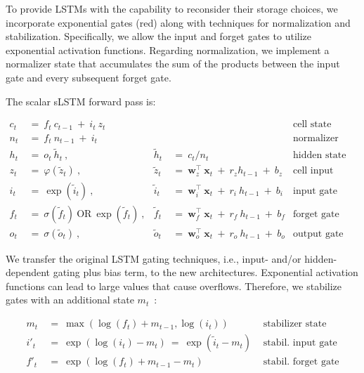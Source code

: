 To provide LSTMs with the capability to reconsider their storage choices, we incorporate exponential gates (red) along with techniques for normalization and stabilization. Specifically, we allow the input and forget gates to utilize exponential activation functions. Regarding normalization, we implement a normalizer state that accumulates the sum of the products between the input gate and every subsequent forget gate.

The scalar sLSTM forward pass is:

\begin{align}
\label{eq:slstmforward}
c_t \ &= \  f_t \ c_{t-1} \ + \ i_t \ z_t & & 
 &\text{cell state} \\
n_t \ &= \  f_t \ n_{t-1} \ + \ i_t  & & 
 &\text{normalizer state} \\
h_t \ &= \ o_t \ \tilde{h}_t \ ,
  &\tilde{h}_t \ &= \ c_t / n_t
&\text{hidden state} \\
z_t \ &= \ \varphi \left( \tilde{z}_t \right) \ , 
  &\tilde{z}_t \ &=  \ \mathbf{w}^\top_{z} \ \mathbf{x}_t \ + \
  r_{z}  h_{t-1} \ + \  b_{z}
  &\text{cell input} \\
i_t \ &= \ \!\exp \left( \tilde{i}_t  \right) \ , 
  &\tilde{i}_t \ &= \ \mathbf{w}^\top_{i} \ \mathbf{x}_t \ + \
  r_{i}  \ h_{t-1} \ + \  b_{i}
  &\text{input gate} \\
f_t \ &= \ \sigma \left(  \tilde{f}_t \right) \ \text{OR} \
\!\exp \left(  \tilde{f}_t \right) \ ,
  &\tilde{f}_t \ &= \ \mathbf{w}^\top_{f} \ \mathbf{x}_t  \ + \
  r_{f}  \ h_{t-1} \ + \  b_{f}
  &\text{forget gate} \\
o_t \ &= \ \sigma \left( \tilde{o}_t \right) \ , 
  &\tilde{o}_t  \ &= \ \mathbf{w}^\top_{o} \ \mathbf{x}_t \ + \
  r_{o}  \ h_{t-1} \ + \  b_{o}
  &\text{output gate} 
\end{align}

We transfer the original LSTM gating techniques, i.e., input- and/or hidden-dependent gating plus bias term, to the new architectures. Exponential activation functions can lead to large values that cause overflows. Therefore, we stabilize gates with an additional state \mbox{$m_t$~\citep{Milakov:18arxiv}}:

\begin{align}
\label{eq:slstmstabil}
m_t \ &= \ \max \left( \log ( f_t ) + m_{t-1} , \log ( i_t ) \right) &\text{stabilizer state} \\
i'_t \ &= \ \!\exp \left( \log \left ( i_t \right) - m_t \right) \ = \ \!\exp \left( \tilde{i}_t - m_t \right) \ \, 
  &\text{stabil. input gate} \\
f'_t \ &= \ \!\exp \left( \log \left( f_t \right) + m_{t-1} - m_t \right) \ \, 
  &\text{stabil. forget gate}
\end{align}

